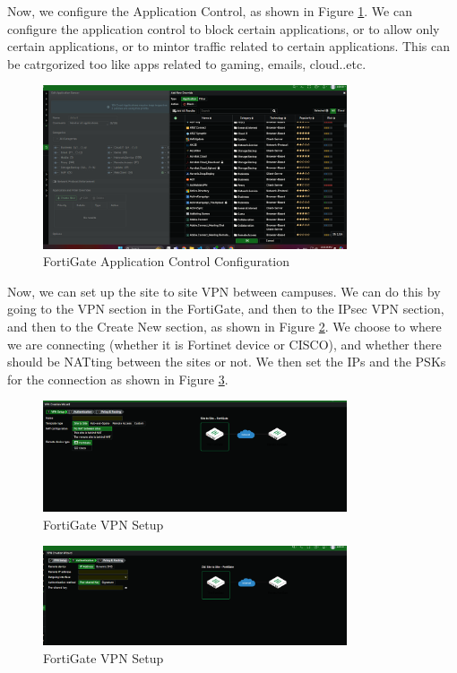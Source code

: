 \documentclass[12pt]{report}
\begin{document}
Now, we configure the Application Control, as shown in Figure \ref{fig:ac}. We can configure the application control to block certain applications, or to allow only certain applications, or to mintor traffic related to certain applications. This can be catrgorized too like apps related to gaming, emails, cloud..etc.
\begin{figure}
    \centering
    \includegraphics[width=0.8\textwidth]{images/Implementation/ac.png}
    \caption{FortiGate Application Control Configuration}
    \label{fig:ac}
\end{figure}
Now, we can set up the site to site VPN between campuses. We can do this by going to the VPN section in the FortiGate, and then to the IPsec VPN section, and then to the Create New section, as shown in Figure \ref{fig:vpnsetup}. We choose to where we are connecting (whether it is Fortinet device or CISCO), and whether there should be NATting between the sites or not. We then set the IPs and the PSKs for the connection as shown in Figure \ref{fig:vpn2}.
\begin{figure}
    \centering
    \includegraphics[width=0.8\textwidth]{images/Implementation/vpnsetup.png}
    \caption{FortiGate VPN Setup}
    \label{fig:vpnsetup}
\end{figure}
\begin{figure}
    \centering
    \includegraphics[width=0.8\textwidth]{images/Implementation/vpn2.png}
    \caption{FortiGate VPN Setup}
    \label{fig:vpn2}
\end{figure}
\end{document}
